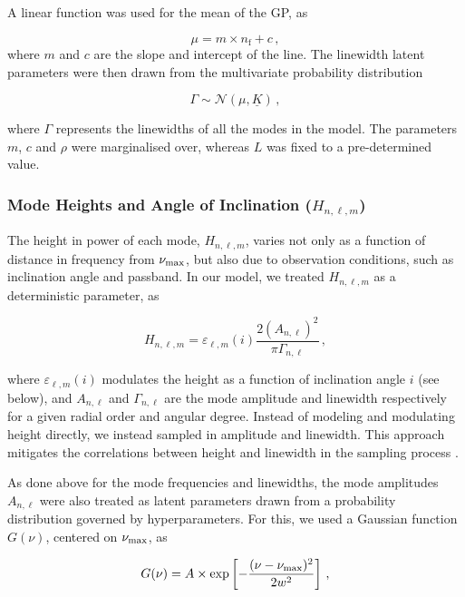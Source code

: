 \documentclass[12pt]{article}
\newcommand{\numax}{\mbox{$\nu_{\rm max}$}\xspace}
\begin{document}
A linear function was used for the mean of the GP, as

\begin{equation}\label{eq:gpmean}
	\mu = m \times n_{\textrm{f}} + c\, ,
\end{equation}
where $m$ and $c$ are the slope and intercept of the line. The linewidth latent parameters were then drawn from the multivariate probability distribution

\begin{equation}\label{eq:gammagp}
	\Gamma \sim \mathcal{N}(\mu, \underline{K})\, ,
\end{equation}

\noindent where $\Gamma$ represents the linewidths of all the modes in the model. The parameters $m$, $c$ and $\rho$ were marginalised over, whereas $L$ was fixed to a pre-determined value.

\subsubsection{Mode Heights and Angle of Inclination ($H_{n,\ell,m}$)}
The height in power of each mode, $H_{n, \ell, m}$, varies not only as a function of distance in frequency from \numax, but also due to observation conditions, such as inclination angle and passband. In our model, we treated $H_{n, \ell, m}$ as a deterministic parameter, as

\begin{equation}\label{eq:height}
	H_{n, \ell, m} =  \varepsilon_{\ell, m}(i) \frac{2 (A_{n, \ell})^2}{\pi \Gamma_{n, \ell}}\, ,
\end{equation}

\noindent where $\varepsilon_{\ell, m}(i)$ modulates the height as a function of inclination angle $i$ (see below), and $A_{n, \ell}$ and $\Gamma_{n, \ell}$ are the mode amplitude and linewidth respectively for a given radial order and angular degree. Instead of modeling and modulating height directly, we instead sampled in amplitude and linewidth. This approach mitigates the correlations between height and linewidth in the sampling process \cite{toutain+appourchaux1994}.

As done above for the mode frequencies and linewidths, the mode amplitudes $A_{n,\ell}$ were also treated as latent parameters drawn from a probability distribution governed by hyperparameters. For this, we used a Gaussian function $G(\nu)$, centered on $\numax$, as

\begin{equation}\label{eq:amplitude}
	G(\nu) = A \times \exp\left[-\frac{(\nu - \numax)^2}{2w^2}\right]\, ,
\end{equation}
\end{document}
